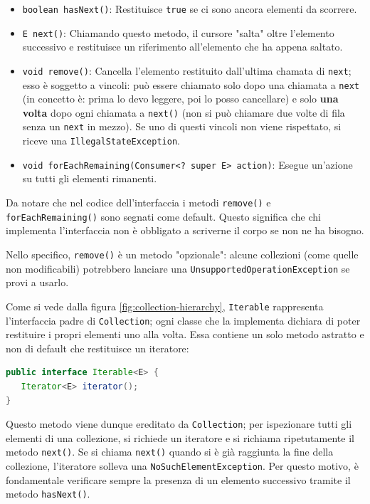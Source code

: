 \begin{itemize}
    \item \texttt{boolean hasNext()}: Restituisce \texttt{true} se ci sono ancora elementi da scorrere.
    \item \texttt{E next()}: Chiamando questo metodo, il cursore "salta" oltre l'elemento successivo e restituisce un riferimento all'elemento che ha appena saltato.
    \item \texttt{void remove()}: Cancella l'elemento restituito dall'ultima chamata di \texttt{next}; esso è soggetto a vincoli: può essere chiamato solo dopo una chiamata a \texttt{next} (in concetto è: prima lo devo leggere, poi lo posso cancellare) e solo \textbf{una volta} dopo ogni chiamata a \texttt{next()} (non si può chiamare due volte di fila senza un \texttt{next} in mezzo). Se uno di questi vincoli non viene rispettato, si riceve una \texttt{IllegalStateException}.
    \item \texttt{void forEachRemaining(Consumer<? super E> action)}: Esegue un'azione su tutti gli elementi rimanenti.
\end{itemize}

\begin{dettagli}[]
    Da notare che nel codice dell'interfaccia i metodi \texttt{remove()} e \texttt{forEachRemaining()} sono segnati come default. Questo significa che chi implementa l'interfaccia non è obbligato a scriverne il corpo se non ne ha bisogno.

    Nello specifico, \texttt{remove()} è un metodo "opzionale": alcune collezioni (come quelle non modificabili) potrebbero lanciare una \texttt{UnsupportedOperationException} se provi a usarlo.
\end{dettagli}

Come si vede dalla figura \ref{fig:collection-hierarchy}, \texttt{Iterable} rappresenta l'interfaccia padre di \texttt{Collection}; ogni classe che la implementa dichiara di poter restituire i propri elementi uno alla volta. Essa contiene un solo metodo astratto e non di default che restituisce un iteratore:

\begin{lstlisting}[language=Java]
public interface Iterable<E> {
   Iterator<E> iterator();
}
\end{lstlisting}

Questo metodo viene dunque ereditato da \texttt{Collection}; per ispezionare tutti gli elementi di una collezione, si richiede un iteratore e si richiama ripetutamente il metodo \texttt{next()}. Se si chiama \texttt{next()} quando si è già raggiunta la fine della collezione, l'iteratore solleva una \texttt{NoSuchElementException}. Per questo motivo, è fondamentale verificare sempre la presenza di un elemento successivo tramite il metodo \texttt{hasNext()}.

